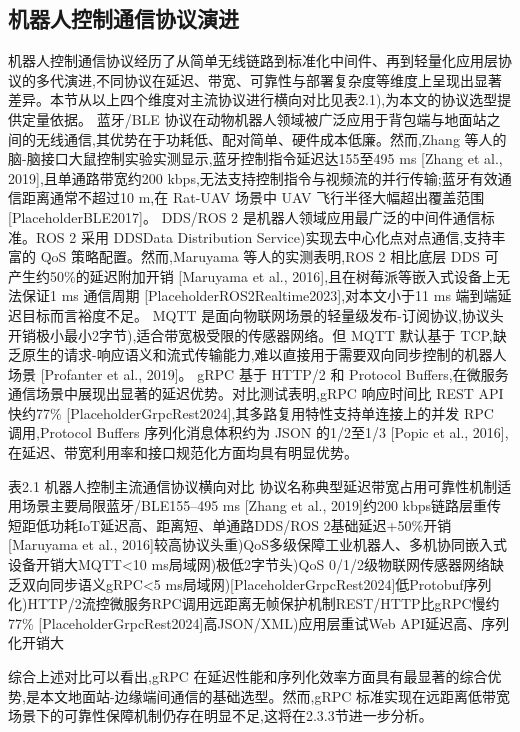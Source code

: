 \subsection{机器人控制通信协议演进}
机器人控制通信协议经历了从简单无线链路到标准化中间件、再到轻量化应用层协议的多代演进,不同协议在延迟、带宽、可靠性与部署复杂度等维度上呈现出显著差异。本节从以上四个维度对主流协议进行横向对比见表2.1),为本文的协议选型提供定量依据。
蓝牙/BLE 协议在动物机器人领域被广泛应用于背包端与地面站之间的无线通信,其优势在于功耗低、配对简单、硬件成本低廉。然而,Zhang 等人的脑-脑接口大鼠控制实验实测显示,蓝牙控制指令延迟达155至495 ms [Zhang et al., 2019],且单通路带宽约200 kbps,无法支持控制指令与视频流的并行传输;蓝牙有效通信距离通常不超过10 m,在 Rat-UAV 场景中 UAV 飞行半径大幅超出覆盖范围 [PlaceholderBLE2017]。
DDS/ROS 2 是机器人领域应用最广泛的中间件通信标准。ROS 2 采用 DDSData Distribution Service)实现去中心化点对点通信,支持丰富的 QoS 策略配置。然而,Maruyama 等人的实测表明,ROS 2 相比底层 DDS 可产生约50\%的延迟附加开销 [Maruyama et al., 2016],且在树莓派等嵌入式设备上无法保证1 ms 通信周期 [PlaceholderROS2Realtime2023],对本文小于11 ms 端到端延迟目标而言裕度不足。
MQTT 是面向物联网场景的轻量级发布-订阅协议,协议头开销极小最小2字节),适合带宽极受限的传感器网络。但 MQTT 默认基于 TCP,缺乏原生的请求-响应语义和流式传输能力,难以直接用于需要双向同步控制的机器人场景 [Profanter et al., 2019]。
gRPC 基于 HTTP/2 和 Protocol Buffers,在微服务通信场景中展现出显著的延迟优势。对比测试表明,gRPC 响应时间比 REST API 快约77\% [PlaceholderGrpcRest2024],其多路复用特性支持单连接上的并发 RPC 调用,Protocol Buffers 序列化消息体积约为 JSON 的1/2至1/3 [Popic et al., 2016],在延迟、带宽利用率和接口规范化方面均具有明显优势。

表2.1 机器人控制主流通信协议横向对比
协议名称典型延迟带宽占用可靠性机制适用场景主要局限蓝牙/BLE155–495 ms [Zhang et al., 2019]约200 kbps链路层重传短距低功耗IoT延迟高、距离短、单通路DDS/ROS 2基础延迟+50\%开销 [Maruyama et al., 2016]较高协议头重)QoS多级保障工业机器人、多机协同嵌入式设备开销大MQTT<10 ms局域网)极低2字节头)QoS 0/1/2级物联网传感器网络缺乏双向同步语义gRPC<5 ms局域网)[PlaceholderGrpcRest2024]低Protobuf序列化)HTTP/2流控微服务RPC调用远距离无帧保护机制REST/HTTP比gRPC慢约77\% [PlaceholderGrpcRest2024]高JSON/XML)应用层重试Web API延迟高、序列化开销大

综合上述对比可以看出,gRPC 在延迟性能和序列化效率方面具有最显著的综合优势,是本文地面站-边缘端间通信的基础选型。然而,gRPC 标准实现在远距离低带宽场景下的可靠性保障机制仍存在明显不足,这将在2.3.3节进一步分析。

